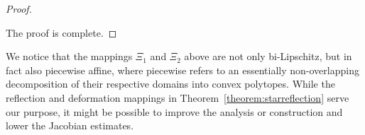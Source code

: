 \documentclass[10pt,letterpaper]{article}
\begin{document}
\begin{proof}
\begin{itemize}
\begin{comment}
                n
                2 \Cdrei{n} \kappa(\calT)
                4 
                \kappa(\calT) 
                \Ceins{n} 
                \Czwei{n} 
                \theta(\calT) %
            \right) 
            2 \Cdrei{n} \kappa(\calT)
            ,
            \\
            \| \Jacobian \Xi^{-1}(x) \|
            \leq 
            \sqrt{n}
            2 
            \kappa(\calT) 
            \Ceins{n} 
            \Czwei{n} 
            \theta(\calT) %
            \left( 
                1
                + 
                n
                2 \Cdrei{n} \kappa(\calT)
                2 
                \kappa(\calT) 
                \Ceins{n} 
                \Czwei{n} 
                \theta(\calT) %
            \right) 
            2 \Cdrei{n} \kappa(\calT)
            .
        \end{gather*}
\end{comment}
    \end{itemize}
    The proof is complete. 
\end{proof}







\begin{remark}
    We notice that the mappings $\Xi_{1}$ and $\Xi_{2}$ above are not only bi-Lipschitz, but in fact also piecewise affine, 
    where piecewise refers to an essentially non-overlapping decomposition of their respective domains into convex polytopes.
    While the reflection and deformation mappings in Theorem~\ref{theorem:starreflection} serve our purpose,
    it might be possible to improve the analysis or construction and lower the Jacobian estimates. 
\end{remark}
\end{document}

